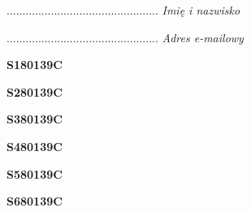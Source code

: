 \begin{turn}{90}\begin{minipage}{\linewidth} \vspace{20mm} ................................................  \textit{Imię i nazwisko}\end{minipage}\end{turn}

\begin{turn}{90}\begin{minipage}{\linewidth} \vspace{20mm} ................................................  \textit{Adres e-mailowy}\end{minipage}\end{turn}

\begin{turn}{90}\huge \begin{minipage}{\linewidth} \vspace{10mm}\textbf{S180139C}\end{minipage}\end{turn}

\begin{turn}{90}\huge \begin{minipage}{\linewidth} \vspace{10mm}\textbf{S280139C}\end{minipage}\end{turn}

\begin{turn}{90}\huge \begin{minipage}{\linewidth} \vspace{10mm}\textbf{S380139C}\end{minipage}\end{turn}

\begin{turn}{90}\huge \begin{minipage}{\linewidth} \vspace{10mm}\textbf{S480139C}\end{minipage}\end{turn}

\begin{turn}{90}\huge \begin{minipage}{\linewidth} \vspace{10mm}\textbf{S580139C}\end{minipage}\end{turn}

\begin{turn}{90}\huge \begin{minipage}{\linewidth} \vspace{10mm}\textbf{S680139C}\end{minipage}\end{turn}

